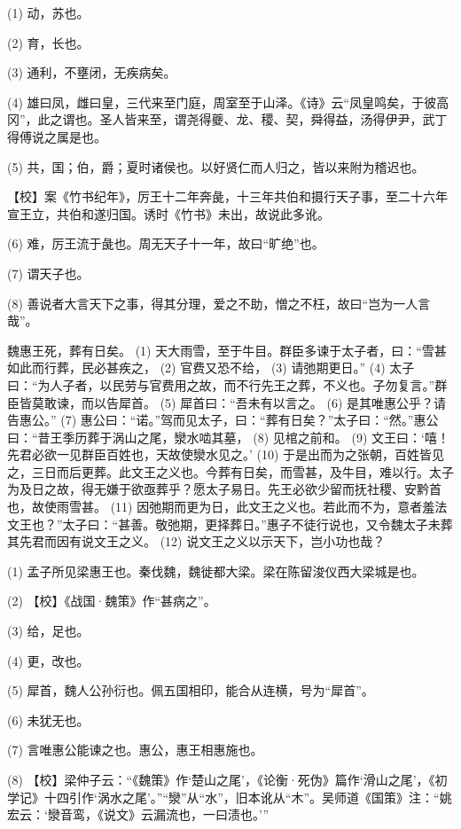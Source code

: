 \documentclass[12pt,UTF8]{ctexbook}
\begin{document}
(1) 动，苏也。

(2) 育，长也。

(3) 通利，不壅闭，无疾病矣。

(4) 雄曰凤，雌曰皇，三代来至门庭，周室至于山泽。《诗》云“凤皇鸣矣，于彼高冈”，此之谓也。圣人皆来至，谓尧得夔、龙、稷、契，舜得益，汤得伊尹，武丁得傅说之属是也。

(5) 共，国；伯，爵；夏时诸侯也。以好贤仁而人归之，皆以来附为稽迟也。

【校】案《竹书纪年》，厉王十二年奔彘，十三年共伯和摄行天子事，至二十六年宣王立，共伯和遂归国。诱时《竹书》未出，故说此多讹。

(6) 难，厉王流于彘也。周无天子十一年，故曰“旷绝”也。

(7) 谓天子也。

(8) 善说者大言天下之事，得其分理，爱之不助，憎之不枉，故曰“岂为一人言哉”。

魏惠王死，葬有日矣。 (1) 天大雨雪，至于牛目。群臣多谏于太子者，曰：“雪甚如此而行葬，民必甚疾之， (2) 官费又恐不给， (3) 请弛期更日。” (4) 太子曰：“为人子者，以民劳与官费用之故，而不行先王之葬，不义也。子勿复言。”群臣皆莫敢谏，而以告犀首。 (5) 犀首曰：“吾未有以言之。 (6) 是其唯惠公乎？请告惠公。” (7) 惠公曰：“诺。”驾而见太子，曰：“葬有日矣？”太子曰：“然。”惠公曰：“昔王季历葬于涡山之尾，灓水啮其墓， (8) 见棺之前和。 (9) 文王曰：‘嘻！先君必欲一见群臣百姓也，天故使灓水见之。’ (10) 于是出而为之张朝，百姓皆见之，三日而后更葬。此文王之义也。今葬有日矣，而雪甚，及牛目，难以行。太子为及日之故，得无嫌于欲亟葬乎？愿太子易日。先王必欲少留而抚社稷、安黔首也，故使雨雪甚。 (11) 因弛期而更为日，此文王之义也。若此而不为，意者羞法文王也？”太子曰：“甚善。敬弛期，更择葬日。”惠子不徒行说也，又令魏太子未葬其先君而因有说文王之义。 (12) 说文王之义以示天下，岂小功也哉？

(1) 孟子所见梁惠王也。秦伐魏，魏徙都大梁。梁在陈留浚仪西大梁城是也。

(2) 【校】《战国·魏策》作“甚病之”。

(3) 给，足也。

(4) 更，改也。

(5) 犀首，魏人公孙衍也。佩五国相印，能合从连横，号为“犀首”。

(6) 未犹无也。

(7) 言唯惠公能谏之也。惠公，惠王相惠施也。

(8) 【校】梁仲子云：“《魏策》作‘楚山之尾’，《论衡·死伪》篇作‘滑山之尾’，《初学记》十四引作‘涡水之尾’。”“灓”从“水”，旧本讹从“木”。吴师道《国策》注：“姚宏云：‘灓音鸾，《说文》云漏流也，一曰渍也。’”
\end{document}
